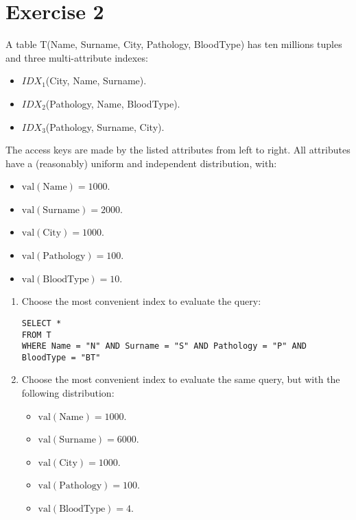 \section{Exercise 2}

A table T(Name, Surname, City, Pathology, BloodType) has ten millions tuples and three multi-attribute indexes:
\begin{itemize}
    \item $IDX_1$(City, Name, Surname).
    \item $IDX_2$(Pathology, Name, BloodType).
    \item $IDX_3$(Pathology, Surname, City).
\end{itemize}
The access keys are made by the listed attributes from left to right. 
All attributes have a (reasonably) uniform and independent distribution, with:
\begin{itemize}
    \item $\text{val}(\text{Name}) = 1000$.
    \item $\text{val}(\text{Surname}) = 2000$.
    \item $\text{val}(\text{City}) = 1000$.
    \item $\text{val}(\text{Pathology}) = 100$.
    \item $\text{val}(\text{BloodType}) = 10$.
\end{itemize}
\begin{enumerate}
    \item Choose the most convenient index to evaluate the query:
        \begin{lstlisting}[style=SQL]
SELECT *
FROM T
WHERE Name = "N" AND Surname = "S" AND Pathology = "P" AND BloodType = "BT"
        \end{lstlisting}
    \item Choose the most convenient index to evaluate the same query, but with the following distribution: 
    \begin{itemize}
        \item $\text{val}(\text{Name}) = 1000$.
        \item $\text{val}(\text{Surname}) = 6000$.
        \item $\text{val}(\text{City}) = 1000$.
        \item $\text{val}(\text{Pathology}) = 100$.
        \item $\text{val}(\text{BloodType}) = 4$.
    \end{itemize}
\end{enumerate}

